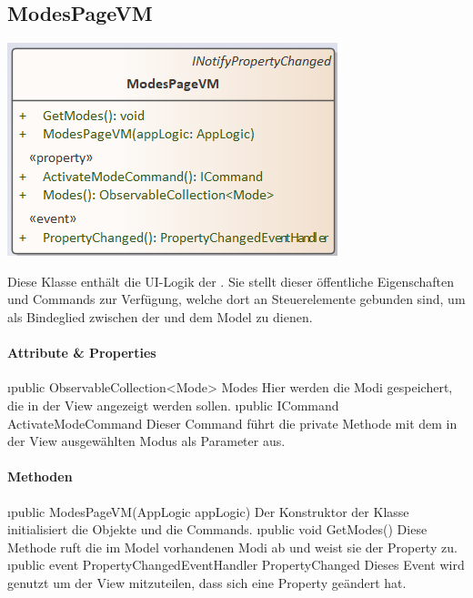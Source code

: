 \documentclass[../entwurf.tex]{subfiles}
\begin{document}
\subsection{ModesPageVM}
\begin{minipage}{0.55\textwidth}
\includegraphics[scale=0.75]{../graphics/vm_klassen/ModesPageVM.png}
\end{minipage}
\begin{minipage}{0.45\textwidth}
Diese Klasse enthält die UI-Logik der . Sie stellt dieser öffentliche Eigenschaften und Commands zur Verfügung, welche dort an Steuerelemente gebunden sind, um als Bindeglied zwischen der  und dem Model zu dienen.
\end{minipage}
\paragraph{Attribute \& Properties}
\begin{itemize}
	\i{public ObservableCollection<Mode> Modes} Hier werden die Modi gespeichert, die in der View angezeigt werden sollen.
	\i{public ICommand ActivateModeCommand} Dieser Command führt die private Methode  mit dem in der View ausgewählten Modus als Parameter aus. 
\end{itemize}
\paragraph{Methoden}
\begin{itemize}
	\i{public ModesPageVM(AppLogic appLogic)} Der Konstruktor der Klasse initialisiert die Objekte  und die Commands.
	\i{public void GetModes()} Diese Methode ruft die im Model vorhandenen Modi ab und weist sie der Property  zu.
	\i{public event PropertyChangedEventHandler PropertyChanged} Dieses Event wird genutzt um der View mitzuteilen, dass sich eine Property geändert hat.
\end{itemize}
\end{document}
